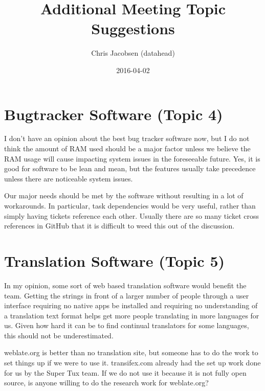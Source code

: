 \documentclass{gd-document}
\begin{document}
\title{Additional Meeting Topic Suggestions}
\author{Chris Jacobsen (datahead)}
\date{2016-04-02}

\maketitle{}

\tableofcontents

\section{Bugtracker Software (Topic 4)}

I don't have an opinion about the best bug tracker software now, but I
do not think the amount of RAM used should be a major factor unless we
believe the RAM usage will cause impacting system issues in the
foreseeable future.  Yes, it is good for software to be lean and mean,
but the features usually take precedence unless there are noticeable
system issues.

Our major needs should be met by the software without resulting in a
lot of workarounds.  In particular, task dependencies would be very
useful, rather than simply having tickets reference each other.
Usually there are so many ticket cross references in GitHub that it is
difficult to weed this out of the discussion.

\section{Translation Software (Topic 5)}

In my opinion, some sort of web based translation software would
benefit the team.  Getting the strings in front of a larger number of
people through a user interface requiring no native apps be installed
and requiring no understanding of a translation text format helps get
more people translating in more languages for us.  Given how hard it
can be to find continual translators for some languages, this should
not be underestimated.

weblate.org is better than no translation site, but someone has to do
the work to set things up if we were to use it.  transifex.com already
had the set up work done for us by the Super Tux team.  If we do not
use it because it is not fully open source, is anyone willing to do
the research work for weblate.org?
\end{document}
